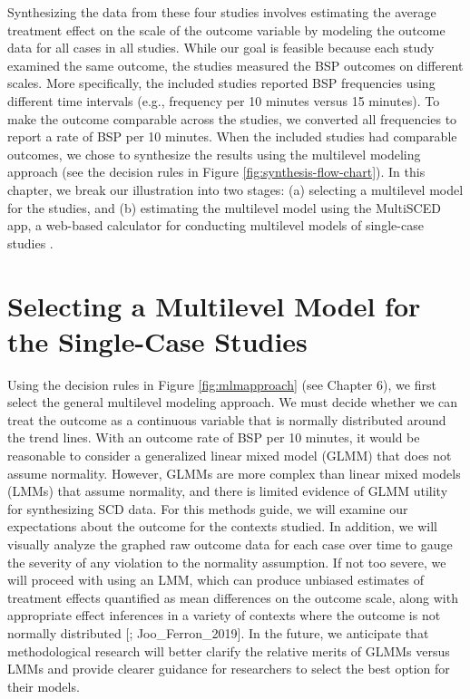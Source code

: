 \documentclass[
]{book}
\begin{document}
Synthesizing the data from these four studies involves estimating the average treatment effect on the scale of the outcome variable by modeling the outcome data for all cases in all studies. While our goal is feasible because each study examined the same outcome, the studies measured the BSP outcomes on different scales. More specifically, the included studies reported BSP frequencies using different time intervals (e.g., frequency per 10 minutes versus 15 minutes). To make the outcome comparable across the studies, we converted all frequencies to report a rate of BSP per 10 minutes. When the included studies had comparable outcomes, we chose to synthesize the results using the multilevel modeling approach (see the decision rules in Figure \ref{fig:synthesis-flow-chart}). In this chapter, we break our illustration into two stages: (a) selecting a multilevel model for the studies, and (b) estimating the multilevel model using the MultiSCED app, a web-based calculator for conducting multilevel models of single-case studies \citep{Declercq2020}.

\hypertarget{selecting-a-multilevel-model-for-the-single-case-studies}{%
\section{Selecting a Multilevel Model for the Single-Case Studies}\label{selecting-a-multilevel-model-for-the-single-case-studies}}

Using the decision rules in Figure \ref{fig:mlmapproach} (see Chapter 6), we first select the general multilevel modeling approach. We must decide whether we can treat the outcome as a continuous variable that is normally distributed around the trend lines. With an outcome rate of BSP per 10 minutes, it would be reasonable to consider a generalized linear mixed model (GLMM) that does not assume normality. However, GLMMs are more complex than linear mixed models (LMMs) that assume normality, and there is limited evidence of GLMM utility for synthesizing SCD data. For this methods guide, we will examine our expectations about the outcome for the contexts studied. In addition, we will visually analyze the graphed raw outcome data for each case over time to gauge the severity of any violation to the normality assumption. If not too severe, we will proceed with using an LMM, which can produce unbiased estimates of treatment effects quantified as mean differences on the outcome scale, along with appropriate effect inferences in a variety of contexts where the outcome is not normally distributed {[}\citet{Declercq2019}; Joo\_Ferron\_2019{]}. In the future, we anticipate that methodological research will better clarify the relative merits of GLMMs versus LMMs and provide clearer guidance for researchers to select the best option for their models.
\end{document}
